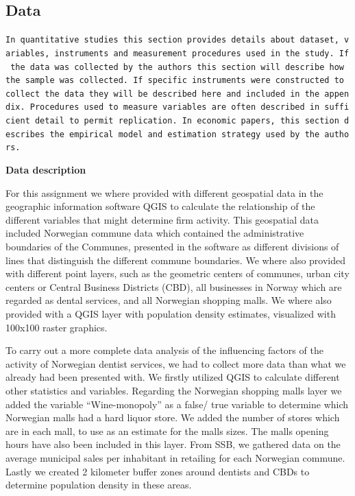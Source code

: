 \documentclass[
  10,
  a4paper,
]{article}
\begin{document}
\hypertarget{data}{%
\subsection{Data}\label{data}}

\texttt{In\ quantitative\ studies\ this\ section\ provides\ details\ about\ dataset,\ variables,\ instruments\ and\ measurement\ procedures\ used\ in\ the\ study.\ If\ the\ data\ was\ collected\ by\ the\ authors\ this\ section\ will\ describe\ how\ the\ sample\ was\ collected.\ If\ specific\ instruments\ were\ constructed\ to\ collect\ the\ data\ they\ will\ be\ described\ here\ and\ included\ in\ the\ appendix.\ Procedures\ used\ to\ measure\ variables\ are\ often\ described\ in\ sufficient\ detail\ to\ permit\ replication.\ In\ economic\ papers,\ this\ section\ describes\ the\ empirical\ model\ and\ estimation\ strategy\ used\ by\ the\ authors.}

\textbf{Data description}

For this assignment we where provided with different geospatial data in
the geographic information software QGIS to calculate the relationship
of the different variables that might determine firm activity. This
geospatial data included Norwegian commune data which contained the
administrative boundaries of the Communes, presented in the software as
different divisions of lines that distinguish the different commune
boundaries. We where also provided with different point layers, such as
the geometric centers of communes, urban city centers or Central
Business Districts (CBD), all businesses in Norway which are regarded as
dental services, and all Norwegian shopping malls. We where also
provided with a QGIS layer with population density estimates, visualized
with 100x100 raster graphics.

To carry out a more complete data analysis of the influencing factors of
the activity of Norwegian dentist services, we had to collect more data
than what we already had been presented with. We firstly utilized QGIS
to calculate different other statistics and variables. Regarding the
Norwegian shopping malls layer we added the variable ``Wine-monopoly''
as a false/ true variable to determine which Norwegian malls had a hard
liquor store. We added the number of stores which are in each mall, to
use as an estimate for the malls sizes. The malls opening hours have
also been included in this layer. From SSB, we gathered data on the
average municipal sales per inhabitant in retailing for each Norwegian
commune. Lastly we created 2 kilometer buffer zones around dentists and
CBDs to determine population density in these areas.
\end{document}
